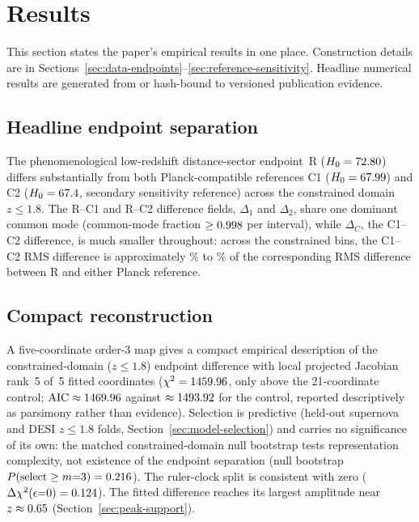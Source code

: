 \section{Results}
\label{sec:results}

This section states the paper's empirical results in one place.
Construction details are in
Sections~\ref{sec:data-endpoints}--\ref{sec:reference-sensitivity}.
Headline numerical results are generated from or hash-bound to versioned publication evidence.

\subsection{Headline endpoint separation}

The phenomenological low-redshift distance-sector endpoint~R
($H_{0}=72.80$\kmsMpc{}) differs substantially from both
Planck-compatible references C1 ($H_{0}=67.99$\kmsMpc{}) and
C2 ($H_{0}=67.4$\kmsMpc{}, secondary sensitivity reference) across the constrained domain
$z\le1.8$.
The R–C1 and R–C2 difference fields, $\Delta_1$ and $\Delta_2$, share one dominant common
mode (common-mode fraction $\ge0.998{}$ per
interval), while $\Delta_C$, the C1–C2 difference, is much smaller throughout: across the constrained bins,
the C1–C2 RMS difference is approximately \ReferenceSensitivityRatioMinPct{}\% to \ReferenceSensitivityRatioMaxPct{}\% of the corresponding RMS difference between R and either Planck reference.

\subsection{Compact reconstruction}

A five-coordinate order-3 map gives a compact empirical
description of the constrained-domain ($z\le1.8$) endpoint difference with local projected Jacobian rank~5
of~5 fitted coordinates ($\chi^{2}=1459.96{}$, only \BridgeDeltaCtrl{} above the
21-coordinate control; $\mathrm{AIC}\approx1469.96{}$ against
$\approx1493.92{}$ for the control, reported descriptively as
parsimony rather than evidence). Selection is
predictive (held-out supernova and DESI $z\le1.8$ folds,
Section~\ref{sec:model-selection}) and carries no significance of
its own: the matched constrained-domain null bootstrap tests representation complexity, not
existence of the endpoint separation (null bootstrap
$P(\mathrm{select}\ge m{=}3)=0.216{}$).
The ruler-clock split is consistent with zero
($\Delta\chi^{2}(\epsilon{=}0)=0.124{}$).
The fitted difference reaches its largest
amplitude near $z\approx0.65{}$ (Section~\ref{sec:peak-support}).

